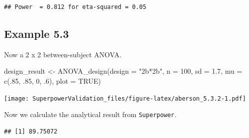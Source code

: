 \documentclass[
]{book}
\newenvironment{Shaded}{\begin{snugshade}}{\end{snugshade}}
\newcommand{\AttributeTok}[1]{\textcolor[rgb]{0.77,0.63,0.00}{#1}}
\newcommand{\ConstantTok}[1]{\textcolor[rgb]{0.00,0.00,0.00}{#1}}
\newcommand{\DecValTok}[1]{\textcolor[rgb]{0.00,0.00,0.81}{#1}}
\newcommand{\FloatTok}[1]{\textcolor[rgb]{0.00,0.00,0.81}{#1}}
\newcommand{\FunctionTok}[1]{\textcolor[rgb]{0.00,0.00,0.00}{#1}}
\newcommand{\NormalTok}[1]{#1}
\newcommand{\OtherTok}[1]{\textcolor[rgb]{0.56,0.35,0.01}{#1}}
\newcommand{\SpecialCharTok}[1]{\textcolor[rgb]{0.00,0.00,0.00}{#1}}
\newcommand{\StringTok}[1]{\textcolor[rgb]{0.31,0.60,0.02}{#1}}
\begin{document}
\begin{verbatim}
## Power  = 0.812 for eta-squared = 0.05
\end{verbatim}

\hypertarget{example-5.3}{%
\subsection{Example 5.3}\label{example-5.3}}

Now a 2 x 2 between-subject ANOVA.

\begin{Shaded}
\begin{Highlighting}[]
\NormalTok{design\_result }\OtherTok{\textless{}{-}} \FunctionTok{ANOVA\_design}\NormalTok{(}\AttributeTok{design =} \StringTok{"2b*2b"}\NormalTok{,}
                              \AttributeTok{n =} \DecValTok{100}\NormalTok{,}
                              \AttributeTok{sd =} \FloatTok{1.7}\NormalTok{,}
                              \AttributeTok{mu =} \FunctionTok{c}\NormalTok{(.}\DecValTok{85}\NormalTok{, .}\DecValTok{85}\NormalTok{, }
                                     \DecValTok{0}\NormalTok{, .}\DecValTok{6}\NormalTok{),}
                              \AttributeTok{plot =} \ConstantTok{TRUE}\NormalTok{)}
\end{Highlighting}
\end{Shaded}

\texttt{[image: SuperpowerValidation\_files/figure-latex/aberson\_5.3.2-1.pdf]}

Now we calculate the analytical result from \texttt{Superpower}.

\begin{Shaded}
\end{Shaded}

\begin{verbatim}
## [1] 89.75072
\end{verbatim}

\begin{Shaded}
\end{Shaded}
\end{document}
